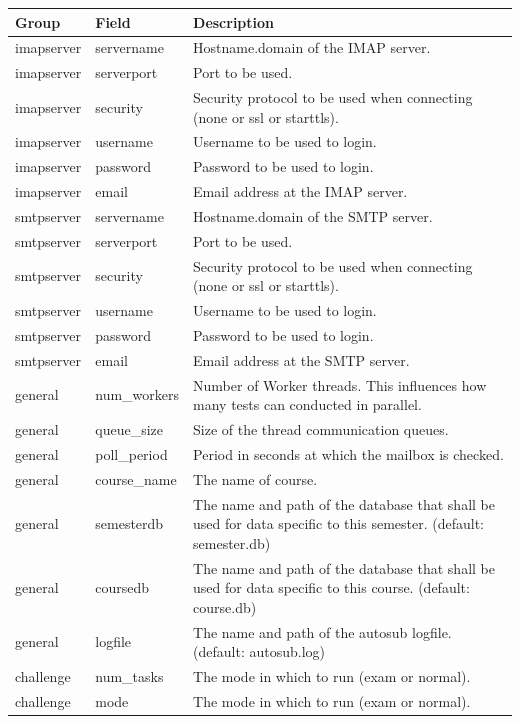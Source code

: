 \begin{tabular}{|p{2.5cm}|p{2.5cm}|p{8cm}|}
\hline
{\bf Group} & {\bf Field} & {\bf Description} \\
\hline
\hline
imapserver & servername & Hostname.domain of the IMAP server.\\
\hline
imapserver & serverport & Port to be used.\\
\hline
imapserver & security & Security protocol to be used when connecting 
	(none or ssl or starttls). \\
\hline
imapserver & username & Username to be used to login. \\ 
\hline
imapserver & password & Password to be used to login. \\
\hline
imapserver & email & Email address at the IMAP server. \\
\hline
\hline
smtpserver & servername & Hostname.domain of the SMTP server.\\
\hline
smtpserver & serverport & Port to be used. \\
\hline
smtpserver & security & Security protocol to be used when connecting
	(none or ssl or starttls). \\
\hline
smtpserver & username & Username to be used to login. \\
\hline
smtpserver & password & Password to be used to login. \\
\hline
smtpserver & email & Email address at the SMTP server. \\
\hline
\hline
general & num\_workers & Number of Worker threads. This influences how many
	tests can conducted in parallel. \\
\hline
general & queue\_size & Size of the thread communication queues. \\
\hline
general & poll\_period & Period in seconds at which the mailbox is checked.\\
\hline
general & course\_name & The name of course.\\
\hline
general & semesterdb & The name and path of the database that shall be used for data specific to
    this semester. (default: semester.db) \\
\hline
general & coursedb & The name and path of the database that shall be used for data specific to
    this course. (default: course.db)\\
\hline
general & logfile & The name and path of the autosub logfile. (default: autosub.log)\\
\hline
\hline
challenge & num\_tasks & The mode in which to run (exam or normal).\\
\hline
challenge & mode & The mode in which to run (exam or normal). \\ 
\hline
\end{tabular}

